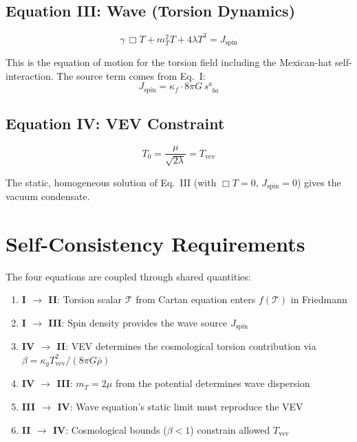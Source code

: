 \documentclass[twocolumn,prd,superscriptaddress,nofootinbib]{revtex4-2}
\begin{document}
\subsection{Equation III: Wave (Torsion Dynamics)}

\begin{equation}
\boxed{\gamma\,\Box T + m_T^2 T + 4\lambda T^3 = J_\text{spin}}
\label{eq:wave}
\end{equation}

This is the equation of motion for the torsion field including the Mexican-hat self-interaction. The source term comes from Eq.~I:
\begin{equation}
J_\text{spin} = \kappa_f \cdot 8\pi G\, s^a_{\phantom{a}ba}
\end{equation}

\subsection{Equation IV: VEV Constraint}

\begin{equation}
\boxed{T_0 = \frac{\mu}{\sqrt{2\lambda}} = T_\text{vev}}
\label{eq:vev}
\end{equation}

The static, homogeneous solution of Eq.~III (with $\Box T = 0$, $J_\text{spin} = 0$) gives the vacuum condensate.

\section{Self-Consistency Requirements}

The four equations are coupled through shared quantities:

\begin{enumerate}
\item \textbf{I $\to$ II}: Torsion scalar $\mathcal{T}$ from Cartan equation enters $f(\mathcal{T})$ in Friedmann
\item \textbf{I $\to$ III}: Spin density provides the wave source $J_\text{spin}$
\item \textbf{IV $\to$ II}: VEV determines the cosmological torsion contribution via $\beta = \kappa_g T_\text{vev}^2 / (8\pi G \bar{\rho})$
\item \textbf{IV $\to$ III}: $m_T = 2\mu$ from the potential determines wave dispersion
\item \textbf{III $\to$ IV}: Wave equation's static limit must reproduce the VEV
\item \textbf{II $\to$ IV}: Cosmological bounds ($\beta < 1$) constrain allowed $T_\text{vev}$
\end{enumerate}
\end{document}
